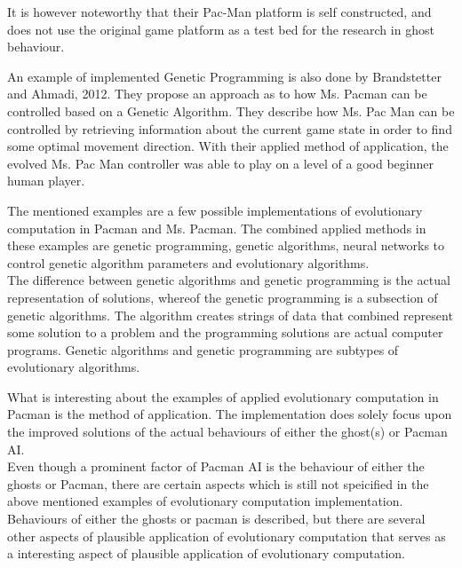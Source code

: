 It is however noteworthy that their Pac-Man platform is self constructed, and does not use the original game platform as a test bed for the research in ghost behaviour.

An example of implemented Genetic Programming is also done by Brandstetter and Ahmadi, 2012. They propose an approach as to how Ms. Pacman can be controlled based on a Genetic Algorithm.
They describe how Ms. Pac Man can be controlled by retrieving information about the current game state in order to find some optimal movement direction.
With their applied method of application, the evolved Ms. Pac Man controller was able to play on a level of a good beginner human player. \cite{Brandstetter2012}

The mentioned examples are a few possible implementations of evolutionary computation in Pacman and Ms. Pacman. The combined applied methods in these examples are genetic programming, genetic algorithms, neural networks to control genetic algorithm parameters and evolutionary algorithms.\\

The difference between genetic algorithms and genetic programming is the actual representation of solutions, whereof the genetic programming is a subsection of genetic algorithms. The algorithm creates strings of data that combined represent some solution to a problem and the programming solutions are actual computer programs.\cite{genetic}
Genetic algorithms and genetic programming are subtypes of evolutionary algorithms.

What is interesting about the examples of applied evolutionary computation in Pacman is the method of application. The implementation does solely focus upon the improved solutions of the actual behaviours of either the ghost(s) or Pacman AI.\\
Even though a prominent factor of Pacman AI is the behaviour of either the ghosts or Pacman, there are certain aspects which is still not speicified in the above mentioned examples of evolutionary computation implementation. Behaviours of either the ghosts or pacman is described, but there are several other aspects of plausible application of evolutionary computation that serves as a interesting aspect of plausible application of evolutionary computation.\\